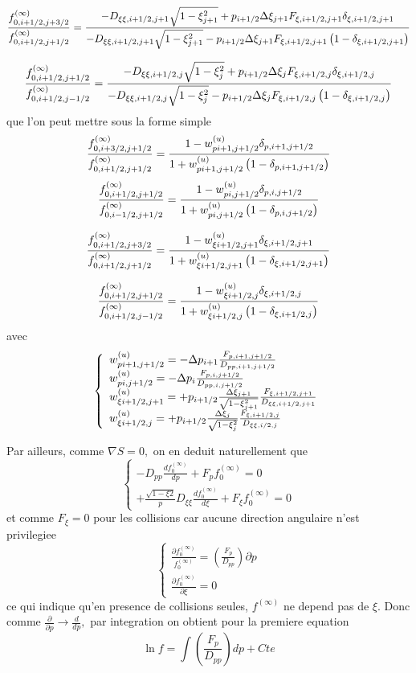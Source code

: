 \[
\frac{f_{0,i+1/2,j+3/2}^{(\infty)}}{f_{0,i+1/2,j+1/2}^{(\infty)}}=\frac{%
-D_{\xi\xi,i+1/2,j+1}\sqrt{1-\xi_{j+1}^{2}}+p_{i+1/2}\Delta\xi_{j+1}F_{%
\xi,i+1/2,j+1}\delta_{\xi,i+1/2,j+1}}{-D_{\xi\xi,i+1/2,j+1}\sqrt{%
1-\xi_{j+1}^{2}}-p_{i+1/2}\Delta\xi_{j+1}F_{\xi,i+1/2,j+1}\left(1-\delta_{%
\xi,i+1/2,j+1}\right)}
\]

\[
\frac{f_{0,i+1/2,j+1/2}^{(\infty)}}{f_{0,i+1/2,j-1/2}^{(\infty)}}=\frac{%
-D_{\xi\xi,i+1/2,j}\sqrt{1-\xi_{j}^{2}}+p_{i+1/2}\Delta\xi_{j}F_{%
\xi,i+1/2,j}\delta_{\xi,i+1/2,j}}{-D_{\xi\xi,i+1/2,j}\sqrt{1-\xi_{j}^{2}}%
-p_{i+1/2}\Delta\xi_{j}F_{\xi,i+1/2,j}\left(1-\delta_{\xi,i+1/2,j}\right)}
\]
que l'on peut mettre sous la forme simple 
\[
\frac{f_{0,i+3/2,j+1/2}^{(\infty)}}{f_{0,i+1/2,j+1/2}^{(\infty)}}=\frac{%
1-w_{pi+1,j+1/2}^{(u)}\delta_{p,i+1,j+1/2}}{1+w_{pi+1,j+1/2}^{(u)}\left(1-%
\delta_{p,i+1,j+1/2}\right)}
\]
\[
\frac{f_{0,i+1/2,j+1/2}^{(\infty)}}{f_{0,i-1/2,j+1/2}^{(\infty)}}=\frac{%
1-w_{pi,j+1/2}^{(u)}\delta_{p,i,j+1/2}}{1+w_{pi,j+1/2}^{(u)}\left(1-%
\delta_{p,i,j+1/2}\right)}
\]

\[
\frac{f_{0,i+1/2,j+3/2}^{(\infty)}}{f_{0,i+1/2,j+1/2}^{(\infty)}}=\frac{%
1-w_{\xi i+1/2,j+1}^{(u)}\delta_{\xi,i+1/2,j+1}}{1+w_{\xi
i+1/2,j+1}^{(u)}\left(1-\delta_{\xi,i+1/2,j+1}\right)}
\]

\[
\frac{f_{0,i+1/2,j+1/2}^{(\infty)}}{f_{0,i+1/2,j-1/2}^{(\infty)}}=\frac{%
1-w_{\xi i+1/2,j}^{(u)}\delta_{\xi,i+1/2,j}}{1+w_{\xi
i+1/2,j}^{(u)}\left(1-\delta_{\xi,i+1/2,j}\right)}
\]
avec 
\[
\left\{ 
\begin{array}{l}
w_{pi+1,j+1/2}^{(u)}=-\Delta p_{i+1}\frac{F_{p,i+1,j+1/2}}{D_{pp,i+1,j+1/2}}
\\ 
w_{pi,j+1/2}^{(u)}=-\Delta p_{i}\frac{F_{p,i,j+1/2}}{D_{pp,i,j+1/2}} \\ 
w_{\xi i+1/2,j+1}^{(u)}=+p_{i+1/2}\frac{\Delta\xi_{j+1}}{\sqrt{%
1-\xi_{j+1}^{2}}}\frac{F_{\xi,i+1/2,j+1}}{D_{\xi\xi,i+1/2,j+1}} \\ 
w_{\xi i+1/2,j}^{(u)}=+p_{i+1/2}\frac{\Delta\xi_{j}}{\sqrt{1-\xi_{j}^{2}}}%
\frac{F_{\xi,i+1/2,j}}{D_{\xi\xi,i/2,j}}
\end{array}
\right.
\]

Par ailleurs, comme $\nabla S=0,$ on en deduit naturellement que 
\[
\left\{ 
\begin{array}{l}
-D_{pp}\frac{df_{0}^{(\infty)}}{dp}+F_{p}f_{0}^{(\infty)}=0 \\ 
+\frac{\sqrt{1-\xi2}}{p}D_{\xi\xi}\frac{df_{0}^{(\infty)}}{d\xi}%
+F_{\xi}f_{0}^{(\infty)}=0
\end{array}
\right.
\]
et comme $F_{\xi}=0$ pour les collisions car aucune direction angulaire
n'est privilegiee 
\[
\left\{ 
\begin{array}{l}
\frac{\partial f_{0}^{(\infty)}}{f_{0}^{(\infty)}}=\left(\frac{F_{p}}{D_{pp}}%
\right)\partial p \\ 
\frac{\partial f_{0}^{(\infty)}}{\partial\xi}=0
\end{array}
\right.
\]
ce qui indique qu'en presence de collisions seules, $f^{(\infty)}$ ne depend
pas de $\xi.$ Donc comme $\frac{\partial}{\partial p}\rightarrow\frac{d}{dp},
$ par integration on obtient pour la premiere equation 
\[
\ln f=\int\left(\frac{F_{p}}{D_{pp}}\right)dp+Cte
\]

